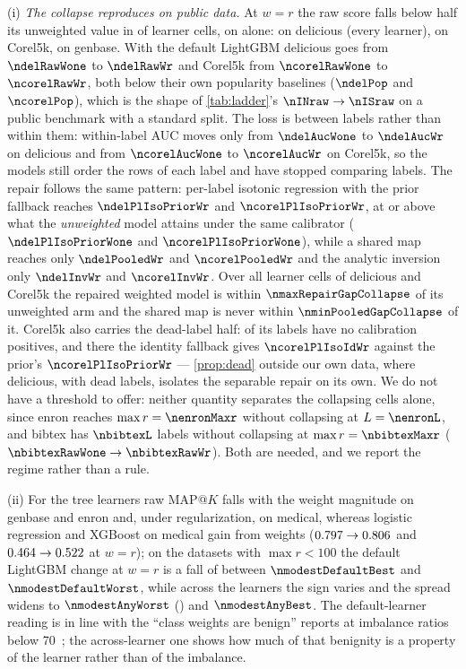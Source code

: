 \documentclass[sigconf,nonacm]{acmart}
\makeatletter
\newcommand{\mapk}{\mathrm{MAP}@K\xspace}
\makeatother
\begin{document}
(i) \emph{The collapse reproduces on public data.} At $w{=}r$ the raw score falls below half its unweighted value in \nnCollapseCells{} of \nnDoseCells{} learner cells, on \ncollapseDatasets{} alone: \nnDelCollapseLearners{} on delicious (every learner), \nnCorelCollapseLearners{} on Corel5k, \nnOtherCollapseCells{} on genbase. With the default LightGBM delicious goes from $\ndelRawWone$ to $\ndelRawWr$ and Corel5k from $\ncorelRawWone$ to $\ncorelRawWr$, both below their own popularity baselines ($\ndelPop$ and $\ncorelPop$), which is the shape of \cref{tab:ladder}'s $\nINraw\to\nISraw$ on a public benchmark with a standard split. The loss is between labels rather than within them: within-label AUC moves only from $\ndelAucWone$ to $\ndelAucWr$ on delicious and from $\ncorelAucWone$ to $\ncorelAucWr$ on Corel5k, so the models still order the rows of each label and have stopped comparing labels. The repair follows the same pattern: per-label isotonic regression with the prior fallback reaches $\ndelPlIsoPriorWr$ and $\ncorelPlIsoPriorWr$, at or above what the \emph{unweighted} model attains under the same calibrator ($\ndelPlIsoPriorWone$ and $\ncorelPlIsoPriorWone$), while a shared map reaches only $\ndelPooledWr$ and $\ncorelPooledWr$ and the analytic inversion only $\ndelInvWr$ and $\ncorelInvWr$. Over all \nnRepairCollapseCells{} learner cells of delicious and Corel5k the repaired weighted model is within $\nmaxRepairGapCollapse$ of its unweighted arm and the shared map is never within $\nminPooledGapCollapse$ of it. Corel5k also carries the dead-label half: \ncorelDeadCalDose{} of its \ncorelL{} labels have no calibration positives, and there the identity fallback gives $\ncorelPlIsoIdWr$ against the prior's $\ncorelPlIsoPriorWr$ --- \cref{prop:dead} outside our own data, where delicious, with \ndelDeadCalDose{} dead labels, isolates the separable repair on its own. We do not have a threshold to offer: neither quantity separates the collapsing cells alone, since enron reaches $\max r=\nenronMaxr$ without collapsing at $L=\nenronL$, and bibtex has $\nbibtexL$ labels without collapsing at $\max r=\nbibtexMaxr$ ($\nbibtexRawWone\to\nbibtexRawWr$). Both are needed, and we report the regime rather than a rule.

(ii) For the tree learners raw $\mapk$ falls with the weight magnitude on genbase and enron and, under regularization, on medical, whereas logistic regression and XGBoost on medical gain from weights ($0.797\to0.806$ and $0.464\to0.522$ at $w{=}r$); on the \nnMulanModest{} datasets with $\max r<100$ the default LightGBM change at $w{=}r$ is a fall of between $\nmodestDefaultBest$ and $\nmodestDefaultWorst$, while across the \nnLearners{} learners the sign varies and the spread widens to $\nmodestAnyWorst$ (\nmodestAnyWorstCell) and $\nmodestAnyBest$. The default-learner reading is in line with the ``class weights are benign'' reports at imbalance ratios below 70~\cite{Liu2026Resampling}; the across-learner one shows how much of that benignity is a property of the learner rather than of the imbalance.
\end{document}
